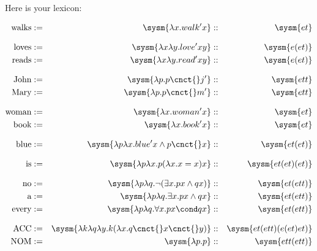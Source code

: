 \documentclass[10pt,a4paper]{exam}
\begin{document}


\vspace{10pt}

%

\vspace{90pt}


Here is your lexicon:


\begin{align*}
	\text{walks}   &:=& \sysm{\lambda x.walk'x}                          &::& \sysm{et}\\[8pt]
	\text{loves}   &:=& \sysm{\lambda x\lambda y.love'xy}                &::& \sysm{e(et)}\\
	\text{reads}   &:=& \sysm{\lambda x\lambda y.read'xy}                &::& \sysm{e(et)}\\[8pt]
	\text{John}    &:=& \sysm{\lambda p.p\cnct{}j'}                      &::& \sysm{ett}\\
	\text{Mary}    &:=& \sysm{\lambda p.p\cnct{}m'}                      &::& \sysm{ett}\\[8pt]
	\text{woman}   &:=& \sysm{\lambda x.woman'x}                         &::& \sysm{et}\\
	\text{book}    &:=& \sysm{\lambda x.book'x}                          &::& \sysm{et}\\[8pt]
	\text{blue}    &:=& \sysm{\lambda p\lambda x.blue'x\land p\cnct{}x}  &::& \sysm{et(et)}\\[8pt]
	\text{is}      &:=& \sysm{\lambda p\lambda x.p (\lambda x.x=x) x}    &::& \sysm{et(et)(et)}\\[8pt]
	\text{no}      &:=& \sysm{\lambda p\lambda q.\neg(\exists x. px \land qx)} &::& \sysm{et(ett)}\\
	\text{a}       &:=& \sysm{\lambda p\lambda q.\exists x. px \land qx} &::& \sysm{et(ett)}\\
	\text{every}   &:=& \sysm{\lambda p\lambda q.\forall x. px \cond qx} &::& \sysm{et(ett)}\\[8pt]
	\text{ACC}     &:=& \sysm{\lambda k \lambda q \lambda y.k (\lambda x.q\cnct{} x\cnct{} y)} &::& \sysm{et(ett)(e(et)et)}\\
	\text{NOM}     &:=& \sysm{\lambda p.p} &::& \sysm{ett(ett)}\\
\end{align*}
\end{document}
